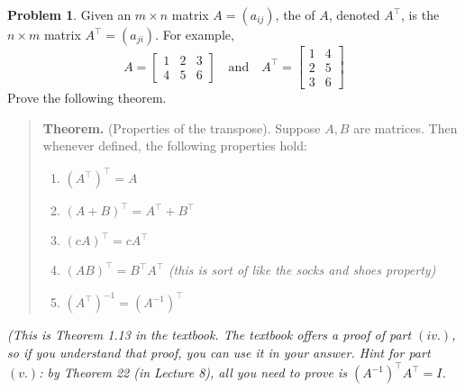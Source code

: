 \documentclass[10pt]{article}
\theoremstyle{definition}
\newtheorem{problem}[theorem]{Problem}
\newcommand{\1}[1]{\textbf{1}_{\left[#1\right]}} %
\newcommand{\dempfcolor}[1]{{\color{RoyalBlue}#1}}
\newcommand{\demph}[1]{\dempfcolor{{\sl #1}}}
\begin{document}
\begin{problem}
  \label{problem:thm}
  Given an $m\times n$ matrix $A=(a_{ij})$, the \demph{\textbf{transpose}} of $A$,
  denoted $A^{\top}$, is the $n\times m$ matrix $A^{\top}=(a_{ji})$. For
  example,
  \begin{equation*}
    A =
    \begin{bmatrix}
      1&2&3\\
      4&5&6
    \end{bmatrix}
    \quad \text{and} \quad
    A^{\top} =
    \begin{bmatrix}
      1&4\\
      2&5\\
      3&6
    \end{bmatrix}
  \end{equation*}
  Prove the following theorem.

  \begin{quote}\textbf{Theorem.} (Properties of the transpose).
    Suppose $A,B$ are matrices. Then whenever defined, the following
    properties hold:
    \begin{enumerate}[label=(\roman*.)]
      \item $\left( A^{\top} \right)^{\top}=A $
      \item $\left( A+B \right)^{\top} = A^{\top}+B^{\top}$
      \item $\left( cA \right)^{\top} = cA^{\top}$
      \item $\left( AB \right)^{\top}=B^{\top}A^{\top}$ \quad\textit{(this is
        sort of like the socks and shoes property)}
      \item $\left( A^{\top} \right)^{-1} = \left( A^{-1} \right)^{\top} $
    \end{enumerate}
  \end{quote}
  \textit{(This is Theorem 1.13 in the textbook. The textbook offers a proof
    of part $(iv.)$, so if you understand that proof, you can use it in your
    answer. Hint for part $(v.)$: by Theorem 22 (in Lecture 8), all you need
    to prove is $(A^{-1})^{\top}A^{\top}=I$.}
\end{problem}
\end{document}
